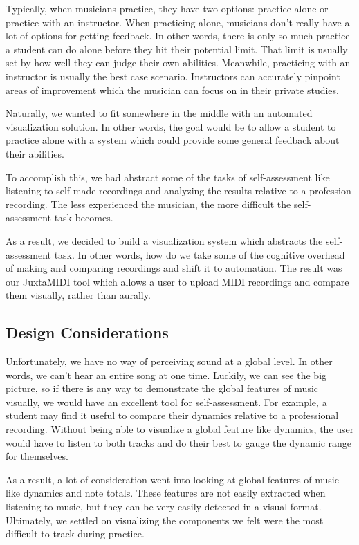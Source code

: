 \documentclass[journal]{vgtc}                %
\begin{document}
Typically, when musicians practice, they have two options: practice alone or
practice with an instructor. When practicing alone, musicians don't really have
a lot of options for getting feedback. In other words, there is only so much
practice a student can do alone before they hit their potential limit. That
limit is usually set by how well they can judge their own abilities. Meanwhile,
practicing with an instructor is usually the best case scenario. Instructors can
accurately pinpoint areas of improvement which the musician can focus on in their
private studies.

Naturally, we wanted to fit somewhere in the middle with an automated
visualization solution. In other words, the goal would be to allow a student to
practice alone with a system which could provide some general feedback about their
abilities.

To accomplish this, we had abstract some of the tasks of self-assessment like
listening to self-made recordings and analyzing the results relative to
a profession recording. The less experienced the musician, the more difficult
the self-assessment task becomes.

As a result, we decided to build a visualization system which abstracts the
self-assessment task. In other words, how do we take some of the cognitive
overhead of making and comparing recordings and shift it to automation. The
result was our JuxtaMIDI tool which allows a user to upload MIDI recordings
and compare them visually, rather than aurally.

\subsection{Design Considerations}

Unfortunately, we have no way of perceiving sound at a global level. In other
words, we can't hear an entire song at one time. Luckily, we can see the
big picture, so if there is any way to demonstrate the global features of
music visually, we would have an excellent tool for self-assessment. For
example, a student may find it useful to compare their dynamics relative
to a professional recording. Without being able to visualize a global
feature like dynamics, the user would have to listen to both tracks and do
their best to gauge the dynamic range for themselves.

As a result, a lot of consideration went into looking at global features of
music like dynamics and note totals. These features are not easily extracted
when listening to music, but they can be very easily detected in a visual
format. Ultimately, we settled on visualizing the components we felt were
the most difficult to track during practice.
\end{document}
